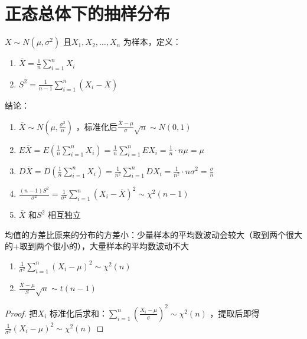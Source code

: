 \section{正态总体下的抽样分布}%
\label{sec:正态总体下的抽样分布}
\begin{cor}
    $X\sim N\left( \mu,\sigma^2  \right)$ 且$X_1,X_2,\ldots ,X_{n}$ 为样本，定义：\begin{enumerate}
        \item $\overline{X}=\frac{1}{n}\sum_{i=1}^{n} X_{i}$
        \item $S^2 =\frac{1}{n-1}\sum_{i=1}^{n} \left( X_{i}-\overline{X} \right)$
    \end{enumerate}
    结论：
    \begin{enumerate}
        \item $\overline{X}\sim N\left( \mu,\frac{\sigma^2}{n} \right)$ ，标准化后$\frac{\overline{X}-\mu}{\sigma}\sqrt{n}\sim N\left( 0,1 \right)$
        \item $E\overline{X}=E\left( \frac{1}{n}\sum_{i=1}^{n} X_{i} \right)=\frac{1}{n}\sum_{i=1}^{n} EX_{i}=\frac{1}{n}\cdot n\mu=\mu$
        \item $D\overline{X}=D\left( \frac{1}{n}\sum_{i=1}^{n} X_{i} \right)=\frac{1}{n^2 }\sum_{i=1}^{n} DX_{i}=\frac{1}{n^2 }\cdot n\sigma^2 =\frac{\sigma}{n}$
        \item $\frac{\left( n-1 \right)S^2 }{\sigma^2 }=\frac{1}{\sigma^2 }\sum_{i=1}^{n} \left( X_{i}-\overline{X} \right)^2 \sim \chi^2 \left( n-1 \right)$
        \item $\overline{X}$ 和$S^2 $ 相互独立
    \end{enumerate}
\end{cor}
\begin{notation}
    均值的方差比原来的分布的方差小：少量样本的平均数波动会较大（取到两个很大的+取到两个很小的），大量样本的平均数波动不大
\end{notation}
\begin{cor}
    \begin{enumerate}
        \item $\frac{1}{\sigma^2 }\sum_{i=1}^{n} \left( X_{i}-\mu \right)^2 \sim \chi^2 \left( n \right)$
        \item $\frac{\overline{X}-\mu}{S}\sqrt{n}\sim t\left( n-1 \right)$
    \end{enumerate}
    \begin{proof}
        把$X_{i}$ 标准化后求和：$\sum_{i=1}^{n} \left( \frac{X_{i}-\mu}{\sigma} \right)^2 \sim \chi^2 \left( n \right)$ ，提取后即得$\frac{1}{\sigma^2 }\left( X_{i}-\mu \right)^2 \sim \chi^2 \left( n \right)$
    \end{proof}
\end{cor}
